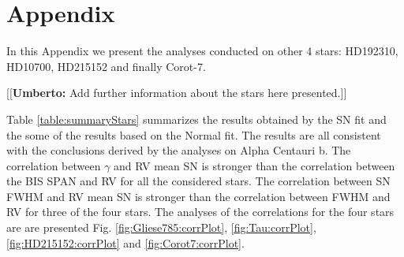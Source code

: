\documentclass[11pt, oneside]{article}
\newcommand{\umberto}[1]{{\color{green}[[\textbf{Umberto: }#1]]}}
\begin{document}
{%
\appendix
\section{Appendix} \label{appendix}

In this Appendix we present the analyses conducted on other 4 stars: HD192310, HD10700, HD215152 and finally Corot-7. 

\umberto{Add further information about the stars here presented.}

Table \ref{table:summaryStars} summarizes the results obtained by the SN fit and the some of the results based on the Normal fit. The results are all consistent with the conclusions derived by the analyses on Alpha Centauri b. The correlation between $\gamma$ and RV mean SN is stronger than the correlation between the BIS SPAN and RV for all the considered stars. The correlation between SN FWHM and RV mean SN is stronger than the correlation between FWHM and RV for three of the four stars. The analyses of the correlations for the four stars are are presented Fig. \ref{fig:Gliese785:corrPlot}, \ref{fig:Tau:corrPlot}, \ref{fig:HD215152:corrPlot} and \ref{fig:Corot7:corrPlot}.

}
\end{document}
